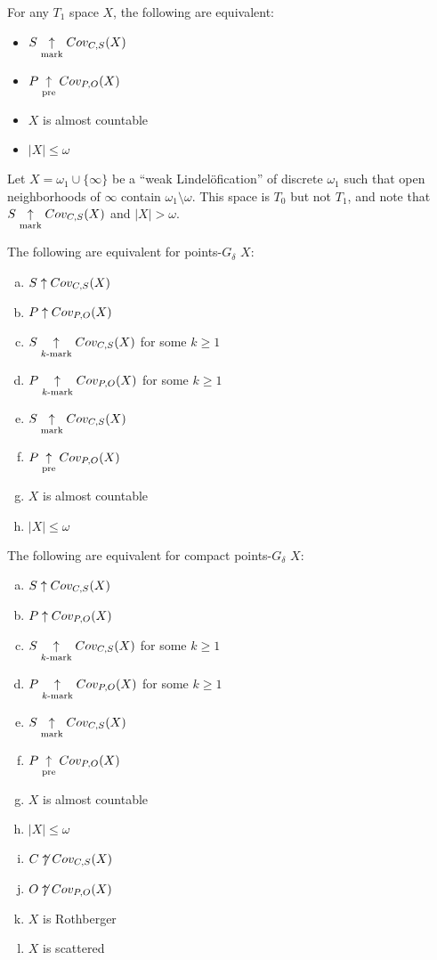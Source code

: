  \begin{thm}
    For any $T_1$ space $X$, the following are equivalent:
    \begin{itemize}
      \item $S\underset{\text{mark}}{\uparrow}Cov_{C,S}(X)$
      \item $P\underset{\text{pre}}{\uparrow}Cov_{P,O}(X)$
      \item $X$ is almost countable
      \item $|X|\leq\omega$
    \end{itemize}
  \end{thm}

  \begin{ex}
    Let $X=\omega_1\cup\{\infty\}$ be a ``weak Lindel\"ofication'' of discrete $\omega_1$ such that open neighborhoods of $\infty$ contain $\omega_1\setminus\omega$. This space is $T_0$ but not $T_1$, and note that $S\underset{\text{mark}}{\uparrow}Cov_{C,S}(X)$ and $|X|>\omega$.
  \end{ex}

  \begin{thm}
    The following are equivalent for points-$G_\delta$ $X$:
      \begin{enumerate}[(a)]
        \item $S\uparrow Cov_{C,S}(X)$
        \item $P\uparrow Cov_{P,O}(X)$
        \item $S\underset{k\text{-mark}}{\uparrow}Cov_{C,S}(X)$ for some $k\geq 1$
        \item $P\underset{k\text{-mark}}{\uparrow}Cov_{P,O}(X)$ for some $k\geq 1$
        \item $S\underset{\text{mark}}{\uparrow}Cov_{C,S}(X)$
        \item $P\underset{\text{pre}}{\uparrow}Cov_{P,O}(X)$
        \item $X$ is almost countable
        \item $|X|\leq\omega$
      \end{enumerate}
  \end{thm}

  \begin{cor}
    The following are equivalent for compact points-$G_\delta$ $X$:
      \begin{enumerate}[(a)]
        \item $S\uparrow Cov_{C,S}(X)$
        \item $P\uparrow Cov_{P,O}(X)$
        \item $S\underset{k\text{-mark}}{\uparrow}Cov_{C,S}(X)$ for some $k\geq 1$
        \item $P\underset{k\text{-mark}}{\uparrow}Cov_{P,O}(X)$ for some $k\geq 1$
        \item $S\underset{\text{mark}}{\uparrow}Cov_{C,S}(X)$
        \item $P\underset{\text{pre}}{\uparrow}Cov_{P,O}(X)$
        \item $X$ is almost countable
        \item $|X|\leq\omega$
        \item $C\not\uparrow Cov_{C,S}(X)$
        \item $O\not\uparrow Cov_{P,O}(X)$
        \item $X$ is Rothberger
        \item $X$ is scattered
      \end{enumerate}
  \end{cor}

